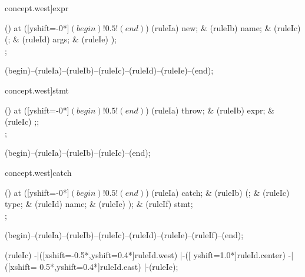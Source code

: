\begin{syntax}[[xshift=18mm]concept.west]{expr}
  
  \node[sequence,column sep=1.1cm] () at ([yshift=-0*\syntaxruledist]$(begin)!0.5!(end)$) {
    \node[terminal]    (ruleIa) {new};
    &
    \node[nonterminal] (ruleIb) {name};
    &
    \node[terminal]    (ruleIc) {(};
    &
    \node[nonterminal] (ruleId) {args};
    &
    \node[terminal]    (ruleIe) {)};
    \\
  };
  
  \draw[path] (begin)--(ruleIa)--(ruleIb)--(ruleIc)--(ruleId)--(ruleIe)--(end);
\end{syntax}

\begin{syntax}[[xshift=18mm]concept.west]{stmt}
  
  \node[sequence,column sep=2.0cm] () at ([yshift=-0*\syntaxruledist]$(begin)!0.5!(end)$) {
    \node[terminal]    (ruleIa) {throw};
    &
    \node[nonterminal] (ruleIb) {expr};
    &
    \node[terminal]    (ruleIc) {;};
    \\
  };
  
  \draw[path] (begin)--(ruleIa)--(ruleIb)--(ruleIc)--(end);
\end{syntax}

\begin{syntax}[[xshift=18mm]concept.west]{catch}
  
  \node[sequence,column sep=1.1cm] () at ([yshift=-0*\syntaxruledist]$(begin)!0.5!(end)$) {
    \node[terminal]    (ruleIa) {catch};
    &
    \node[terminal]    (ruleIb) {(};
    &
    \node[nonterminal] (ruleIc) {type};
    &
    \node[nonterminal] (ruleId) {name};
    &
    \node[terminal]    (ruleIe) {)};
    &
    \node[nonterminal] (ruleIf) {stmt};
    \\
  };
  
  \draw[path] (begin)--(ruleIa)--(ruleIb)--(ruleIc)--(ruleId)--(ruleIe)--(ruleIf)--(end);
  
  \draw[path] (ruleIc)
            -|([xshift=-0.5*\syntaxruledist,yshift=0.4*\syntaxruledist]ruleId.west)
            |-([                             yshift=1.0*\syntaxruledist]ruleId.center)
            -|([xshift= 0.5*\syntaxruledist,yshift=0.4*\syntaxruledist]ruleId.east)
            |-(ruleIe);
\end{syntax}


